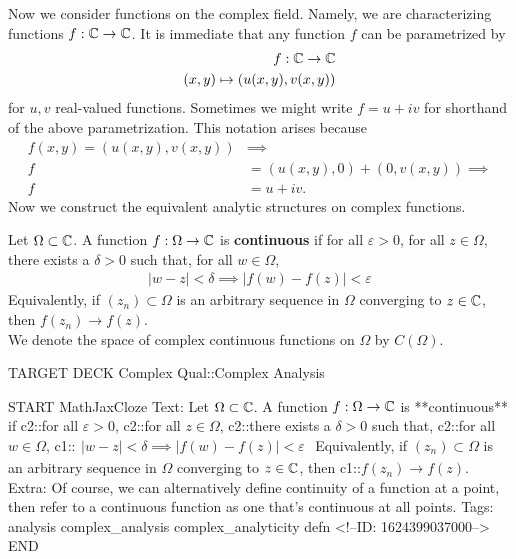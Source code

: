 \documentclass{memoir}
\begin{document}

Now we consider functions on the complex field. Namely, we are characterizing functions \(f:\mathbb{C}\to \mathbb{C}\). It is immediate that any function \(f\) can be parametrized by
\begin{align*}
	f:\mathbb{C}\to \mathbb{C}\\
	(x,y) \mapsto (u(x,y),v(x,y))
\end{align*}
for \(u,v \) real-valued functions. Sometimes we might write \(f = u + iv\) for shorthand of the above parametrization. This notation arises because
\begin{align*}
	f(x,y) = (u(x,y),v(x,y)) &\implies\\
	f &= (u(x,y),0) + (0,v(x,y)) \implies\\
	f &= u + iv.
\end{align*}
Now we construct the equivalent analytic structures on complex functions.
\begin{defn}
	Let \(\Omega\subset \mathbb{C}\). A function \(f:\Omega\to \mathbb{C}\) is \textbf{continuous} if for all \(\varepsilon >0\), for all \(z \in \Omega\), there exists a \(\delta>0\) such that, for all \(w \in \Omega\),
	\begin{align*}
		|w-z| < \delta \implies \left| f(w)-f(z) \right| < \varepsilon
	\end{align*}
Equivalently, if \((z_n) \subset \Omega\) is an arbitrary sequence in \(\Omega\) converging to \(z \in \mathbb{C}\), then \(f(z_n) \to f(z)\).\\

We denote the space of complex continuous functions on \(\Omega\) by \(C(\Omega)\).
\end{defn}

\begin{anki}
TARGET DECK
Complex Qual::Complex Analysis

START
MathJaxCloze
Text: Let \(\Omega\subset \mathbb{C}\). A function \(f:\Omega\to \mathbb{C}\) is **continuous** if {{c2::for all \(\varepsilon >0\)}}, {{c2::for all \(z \in \Omega\)}}, {{c2::there exists a \(\delta>0\)}} such that, {{c2::for all \(w \in \Omega\)}},
{{c1::\(\begin{align*}
        	|w-z| < \delta \implies \left| f(w)-f(z) \right| < \varepsilon
        \end{align*}\)}} 
Equivalently, if \((z_n) \subset \Omega\) is an arbitrary sequence in \(\Omega\) converging to \(z \in \mathbb{C}\), then {{c1::\(f(z_n) \to f(z)\)}}.
Extra: Of course, we can alternatively define continuity of a function at a point, then refer to a continuous function as one that's continuous at all points.
Tags: analysis complex_analysis complex_analyticity defn
<!--ID: 1624399037000-->
END
\end{anki}
\end{document}

